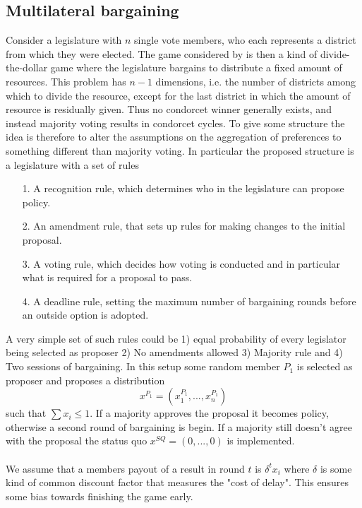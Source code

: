 \subsection{Multilateral bargaining \citep{baron_bargaining_1989}} 
Consider a legislature with $n$ single vote members, who each represents a district from which they were elected. The game considered by \cite{baron_bargaining_1989} is then a kind of divide-the-dollar game where the legislature bargains to distribute a fixed amount of resources.
This problem has $n-1$ dimensions, i.e. the number of districts among which to divide the resource, except for the last district in which the amount of resource is residually given. Thus no condorcet winner generally exists, and instead majority voting results in condorcet cycles. To give some structure the idea is therefore to alter the assumptions on the aggregation of preferences to something different than majority voting. In particular the proposed structure is a legislature with a set of rules
\begin{itemize}
    \item[1.] A recognition rule, which determines who in the legislature can propose policy.
    \item[2.] An amendment rule, that sets up rules for making changes to the initial proposal. 
    \item[3.] A voting rule, which decides how voting is conducted and in particular what is required for a proposal to pass. 
    \item[4.] A deadline rule, setting the maximum number of bargaining rounds before an outside option is adopted.  
\end{itemize}
A very simple set of such rules could be 1) equal probability of every legislator being selected as proposer 2) No amendments allowed 3) Majority rule and 4) Two sessions of bargaining. In this setup some random member $P_1$ is selected as proposer and proposes a distribution 
\begin{equation}
    x^{P_1} = (x_1^{P_1},...,x_n^{P_1})
\end{equation}
such that $\sum x_i \leq 1$. If a majority approves the proposal it becomes policy, otherwise a second round of bargaining is begin. If a majority still doesn't agree with the proposal the status quo $x^{SQ}=(0,...,0)$ is implemented.
\\ \\ 
We assume that a members payout of a result in round $t$ is $\delta^t x_i$ where $\delta$ is some kind of common discount factor that measures the "cost of delay". This ensures some bias towards finishing the game early. 
